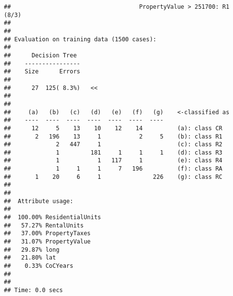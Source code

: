 \documentclass[
]{article}
\newenvironment{Shaded}{\begin{snugshade}}{\end{snugshade}}
\newcommand{\AttributeTok}[1]{\textcolor[rgb]{0.77,0.63,0.00}{#1}}
\newcommand{\CommentTok}[1]{\textcolor[rgb]{0.56,0.35,0.01}{\textit{#1}}}
\newcommand{\ConstantTok}[1]{\textcolor[rgb]{0.00,0.00,0.00}{#1}}
\newcommand{\FunctionTok}[1]{\textcolor[rgb]{0.00,0.00,0.00}{#1}}
\newcommand{\NormalTok}[1]{#1}
\newcommand{\OtherTok}[1]{\textcolor[rgb]{0.56,0.35,0.01}{#1}}
\newcommand{\SpecialCharTok}[1]{\textcolor[rgb]{0.00,0.00,0.00}{#1}}
\newcommand{\StringTok}[1]{\textcolor[rgb]{0.31,0.60,0.02}{#1}}
\begin{document}
\begin{verbatim}
##                                     PropertyValue > 251700: R1 (8/3)
## 
## 
## Evaluation on training data (1500 cases):
## 
##      Decision Tree   
##    ----------------  
##    Size      Errors  
## 
##      27  125( 8.3%)   <<
## 
## 
##     (a)   (b)   (c)   (d)   (e)   (f)   (g)    <-classified as
##    ----  ----  ----  ----  ----  ----  ----
##      12     5    13    10    12    14          (a): class CR
##       2   196    13     1           2     5    (b): class R1
##             2   447     1                      (c): class R2
##             1         181     1     1     1    (d): class R3
##             1           1   117     1          (e): class R4
##             1     1     1     7   196          (f): class RA
##       1    20     6     1               226    (g): class RC
## 
## 
##  Attribute usage:
## 
##  100.00% ResidentialUnits
##   57.27% RentalUnits
##   37.00% PropertyTaxes
##   31.07% PropertyValue
##   29.87% long
##   21.80% lat
##    0.33% CoCYears
## 
## 
## Time: 0.0 secs
\end{verbatim}

\begin{Shaded}
\end{Shaded}
\end{document}
